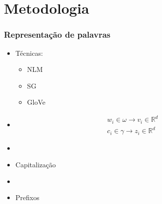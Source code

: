 \documentclass[10pt]{beamer}
\begin{document}
\section{Metodologia}


\begin{frame}[fragile]
\frametitle{Representação de palavras}


  \begin{itemize}

    \item Técnicas:
    \begin{itemize}
      \item[-] NLM
      \item[-] SG
      \item[-] GloVe
    \end{itemize}

    \item[\ ] \begin{align} \nonumber 
    w_i \in \omega \to v_i \in \mathbb{R}^d \\
    c_i \in \gamma \to z_i \in \mathbb{R}^d \nonumber 
    \end{align}

    \item[\ ] \ 

    \item Capitalização

    \item[\ ] \ 

    \item Prefixos

  \end{itemize}

\end{frame}
\end{document}
